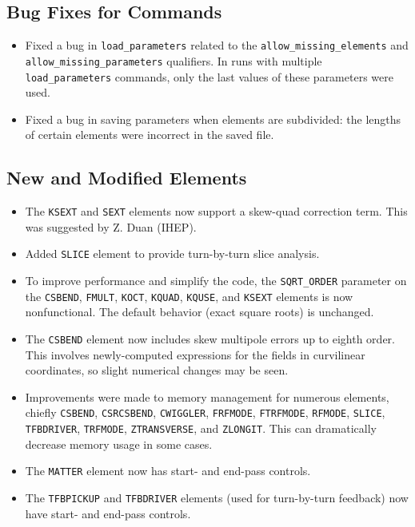 \documentclass[11pt]{article}
\begin{document}
\subsection{Bug Fixes for Commands}
\begin{itemize}
\item Fixed a bug in \verb|load_parameters| related to the \verb|allow_missing_elements| and \verb|allow_missing_parameters|
  qualifiers. In runs with multiple \verb|load_parameters| commands, only the last values of these parameters were used.
\item Fixed a bug in saving parameters when elements are subdivided: the lengths of certain elements were incorrect in
  the saved file.
\end{itemize}

\subsection{New and Modified Elements}
\begin{itemize}
\item The \verb|KSEXT| and \verb|SEXT| elements now support a skew-quad correction term. This was suggested by Z. Duan (IHEP).
\item Added \verb|SLICE| element to provide turn-by-turn slice analysis.
\item To improve performance and simplify the code, the \verb|SQRT_ORDER| parameter on the \verb|CSBEND|, 
  \verb|FMULT|, \verb|KOCT|, \verb|KQUAD|, \verb|KQUSE|, and \verb|KSEXT| elements is now nonfunctional.
  The default behavior (exact square roots) is unchanged.
\item The \verb|CSBEND| element now includes skew multipole errors up to eighth order. This involves newly-computed expressions for the
  fields in curvilinear coordinates, so slight numerical changes may be seen.
\item Improvements were made to memory management for numerous elements, chiefly \verb|CSBEND|, \verb|CSRCSBEND|,
  \verb|CWIGGLER|, \verb|FRFMODE|, \verb|FTRFMODE|, \verb|RFMODE|, \verb|SLICE|, \verb|TFBDRIVER|, \verb|TRFMODE|,
  \verb|ZTRANSVERSE|, and \verb|ZLONGIT|. This can dramatically decrease memory usage in some cases.
\item The \verb|MATTER| element now has start- and end-pass controls.
\item The \verb|TFBPICKUP| and \verb|TFBDRIVER| elements (used for turn-by-turn feedback) now have start- and end-pass controls.
\end{itemize}
\end{document}
